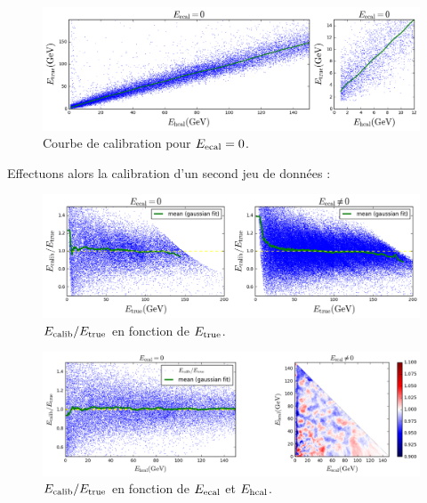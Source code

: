 \documentclass[11pt,a4paper]{article}
\begin{document}
\begin{figure}[!h]
\begin{center}
\includegraphics[width=\textwidth]{images/pictures/testKNNGF/KNNGaussianFit_calibration.png}
\caption{Courbe de calibration pour $E_{\rm ecal} = 0$.}
\end{center}
\end{figure}

Effectuons alors la calibration d'un second jeu de données : 
\begin{figure}[!h]
\begin{center}
\includegraphics[width=\textwidth]{images/pictures/testKNNGF/KNNGaussianFit_ecalib_over_etrue.png}
\caption{$E_{\rm calib}/E_{\rm true}$ en fonction de $E_{\rm true}$.}
\label{ecaliboveretrueKNNGF}
\end{center}
\end{figure}

\begin{figure}[!h]
\begin{center}
\includegraphics[width=\textwidth]{images/pictures/testKNNGF/KNNGaussianFit_ecalib_over_etrue_functionof_ecal_hcal.png}
\caption{$E_{\rm calib}/E_{\rm true}$ en fonction de $E_{\rm ecal}$ et $E_{\rm hcal}$.}
\label{ecaliboveretrueKNNGF_ecal_hcal}
\end{center}
\end{figure}
\end{document}
